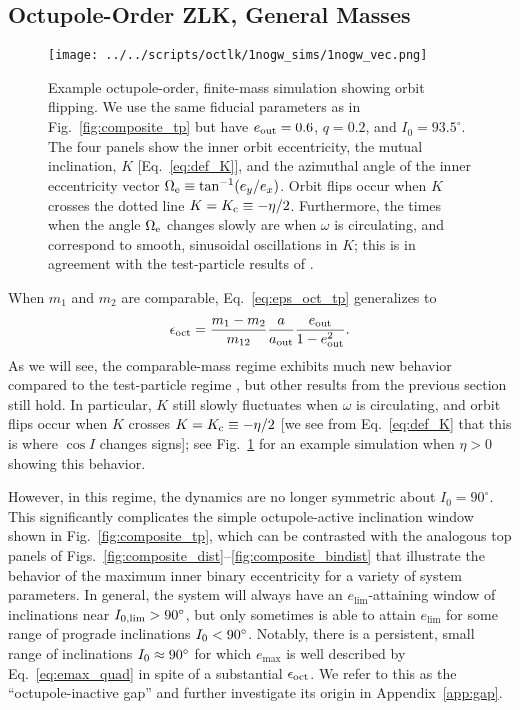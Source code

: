 \documentclass[
        fleqn,
        usenatbib,
    ]{mnras}
\newlength{\colummwidth}
\begin{document}
\subsection{Octupole-Order ZLK, General Masses}\label{ss:oct_gen}

\begin{figure}
    \centering
    \texttt{[image: ../../scripts/octlk/1nogw\_sims/1nogw\_vec.png]}
    \caption{Example octupole-order, finite-mass simulation showing orbit
    flipping. We use the same fiducial parameters as in
    Fig.~\ref{fig:composite_tp} but have $e_{\rm out} = 0.6$, $q = 0.2$, and
    $I_0 = 93.5^\circ$. The four panels show the inner orbit eccentricity, the
    mutual inclination, $K$ [Eq.~\eqref{eq:def_K}], and the azimuthal angle of
    the inner eccentricity vector $\Omega_{\rm e} \equiv \tan^{-1}(e_y / e_x)$.
    Orbit flips occur when $K$ crosses the dotted line $K = K_{\rm c} \equiv
    -\eta / 2$. Furthermore, the times when the angle $\Omega_{\rm e}$ changes
    slowly are when $\omega$ is circulating, and correspond to smooth,
    sinusoidal oscillations in $K$; this is in agreement with the test-particle
    results of \citet{katz2011long}.
    }\label{fig:nogw_fiducial}
\end{figure}
When $m_1$ and $m_2$ are comparable, Eq.~\eqref{eq:eps_oct_tp} generalizes to
\citep{LML15, anderson2016formation, LL18}
\begin{equation}
    \epsilon_{\rm oct} = \frac{m_1 - m_2}{m_{12}} \frac{a}{a_{\rm out}}
        \frac{e_{\rm out}}{1 - e_{\rm out}^2}.\label{eq:eps_oct}
\end{equation}
As we will see, the comparable-mass regime exhibits much new behavior compared
to the test-particle regime \citep[see also][]{rodet_inprep}, but other results
from the previous section still hold. In particular, $K$ still slowly fluctuates
when $\omega$ is circulating, and orbit flips occur when $K$ crosses $K = K_{\rm
c} \equiv -\eta / 2$ [we see from Eq.~\eqref{eq:def_K} that this is where $\cos
I$ changes signs]; see Fig.~\ref{fig:nogw_fiducial} for an example simulation
when $\eta > 0$ showing this behavior.

However, in this regime, the dynamics are no longer symmetric about $I_0 =
90^\circ$. This significantly complicates the simple octupole-active inclination
window shown in Fig.~\ref{fig:composite_tp}, which can be contrasted with the
analogous top panels of
Figs.~\ref{fig:composite_dist}--\ref{fig:composite_bindist} that illustrate the
behavior of the maximum inner binary eccentricity for a variety of system
parameters. In general, the system will always have an $e_{\lim}$-attaining
window of inclinations near $I_{\rm 0, \lim} > 90^\circ$, but only sometimes is
able to attain $e_{\lim}$ for some range of prograde inclinations $I_{\rm 0} <
90^\circ$. Notably, there is a persistent, small range of inclinations $I_{\rm
0} \approx 90^\circ$ for which $e_{\max}$ is well described by
Eq.~\eqref{eq:emax_quad} in spite of a substantial $\epsilon_{\rm oct}$. We
refer to this as the ``octupole-inactive gap'' and further investigate its
origin in Appendix~\ref{app:gap}.
\end{document}
